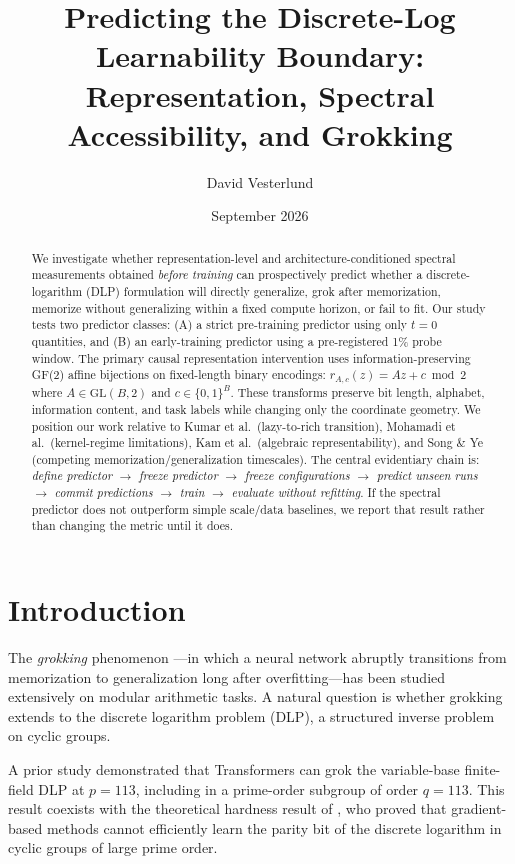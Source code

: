 \documentclass[11pt]{article}
\title{\textbf{Predicting the Discrete-Log Learnability Boundary:}\\
Representation, Spectral Accessibility, and Grokking}
\author{David Vesterlund}
\date{September 2026}
\begin{document}
\maketitle

\begin{abstract}
We investigate whether representation-level and architecture-conditioned spectral measurements obtained \emph{before training} can prospectively predict whether a discrete-logarithm (DLP) formulation will directly generalize, grok after memorization, memorize without generalizing within a fixed compute horizon, or fail to fit. Our study tests two predictor classes: (A) a strict pre-training predictor using only $t=0$ quantities, and (B) an early-training predictor using a pre-registered 1\% probe window. The primary causal representation intervention uses information-preserving GF(2) affine bijections on fixed-length binary encodings: $r_{A,c}(z) = Az + c \bmod 2$ where $A \in \text{GL}(B, 2)$ and $c \in \{0,1\}^B$. These transforms preserve bit length, alphabet, information content, and task labels while changing only the coordinate geometry. We position our work relative to Kumar et al.\ (lazy-to-rich transition), Mohamadi et al.\ (kernel-regime limitations), Kam et al.\ (algebraic representability), and Song \& Ye (competing memorization/generalization timescales). The central evidentiary chain is: \emph{define predictor $\to$ freeze predictor $\to$ freeze configurations $\to$ predict unseen runs $\to$ commit predictions $\to$ train $\to$ evaluate without refitting}. If the spectral predictor does not outperform simple scale/data baselines, we report that result rather than changing the metric until it does.
\end{abstract}

\section{Introduction}\label{sec:intro}

The \emph{grokking} phenomenon \citep{power2022grokking}---in which a neural network abruptly transitions from memorization to generalization long after overfitting---has been studied extensively on modular arithmetic tasks. A natural question is whether grokking extends to the discrete logarithm problem (DLP), a structured inverse problem on cyclic groups.

A prior study \citep{vesterlund2026grokking} demonstrated that Transformers can grok the variable-base finite-field DLP at $p=113$, including in a prime-order subgroup of order $q=113$. This result coexists with the theoretical hardness result of \citet{takhanov2024intractability}, who proved that gradient-based methods cannot efficiently learn the parity bit of the discrete logarithm in cyclic groups of large prime order.
\end{document}
